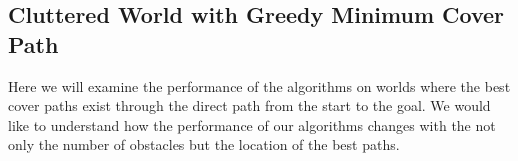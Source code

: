 




\subsection{Cluttered World with Greedy Minimum Cover Path} \label{res:cluttered_world}
Here we will examine the performance of the algorithms on worlds where the best cover paths exist through the direct path from the start to the goal. We would like to understand how the performance of our algorithms changes with the not only the number of obstacles but the location of the best paths.

